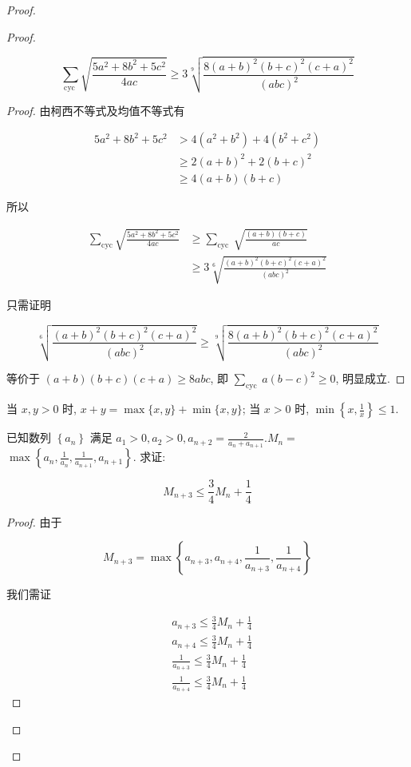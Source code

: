 \begin{proof}
\begin{example}
\begin{solution}
\begin{note}
\begin{solution}
\begin{proof}
\begin{example}
	$$
	\sum_{\text {cyc }} \sqrt{\frac{5 a^{2}+8 b^{2}+5 c^{2}}{4 a c}} \geqslant 3 \sqrt[9]{\frac{8(a+b)^{2}(b+c)^{2}(c+a)^{2}}{(a b c)^{2}}}
	$$
\end{example}
\begin{proof}
	由柯西不等式及均值不等式有
	
	$$
	\begin{aligned}
	5 a^{2}+8 b^{2}+5 c^{2} & >4\left(a^{2}+b^{2}\right)+4\left(b^{2}+c^{2}\right) \\
	& \geqslant 2(a+b)^{2}+2(b+c)^{2} \\
	& \geqslant 4(a+b)(b+c)
	\end{aligned}
	$$
	
	所以
	
	$$
	\begin{aligned}
	\sum_{\mathrm{cyc}} \sqrt{\frac{5 a^{2}+8 b^{2}+5 c^{2}}{4 a c}} & \geqslant \sum_{\text {cyc }} \sqrt{\frac{(a+b)(b+c)}{a c}} \\
	& \geqslant 3 \sqrt[6]{\frac{(a+b)^{2}(b+c)^{2}(c+a)^{2}}{(a b c)^{2}}}
	\end{aligned}
	$$
	
	只需证明
	
	$$
	\sqrt[6]{\frac{(a+b)^{2}(b+c)^{2}(c+a)^{2}}{(a b c)^{2}}} \geqslant \sqrt[9]{\frac{8(a+b)^{2}(b+c)^{2}(c+a)^{2}}{(a b c)^{2}}}
	$$
	
	等价于 $(a+b)(b+c)(c+a) \geqslant 8 a b c$, 即 $\sum_{\text {cyc }} a(b-c)^{2} \geqslant 0$, 明显成立.
\end{proof}
\begin{note}
	当 $x, y>0$ 时, $x+y=\max \{x, y\}+\min \{x, y\}$; 当 $x>0$ 时, $\min \left\{x, \frac{1}{x}\right\} \leqslant 1$.
\end{note}

\begin{example}
	已知数列 $\left\{a_{n}\right\}$ 满足 $a_{1}>0, a_{2}>0, a_{n+2}=\frac{2}{a_{n}+a_{n+1}} . M_{n}=$ $\max \left\{a_{n}, \frac{1}{a_{n}}, \frac{1}{a_{n+1}}, a_{n+1}\right\}$. 求证:
	
	$$
	M_{n+3} \leqslant \frac{3}{4} M_{n}+\frac{1}{4}
	$$
\end{example}
\begin{proof}
	由于
	
	$$
	M_{n+3}=\max \left\{a_{n+3}, a_{n+4}, \frac{1}{a_{n+3}}, \frac{1}{a_{n+4}}\right\}
	$$
	
	我们需证
	
	$$
	\begin{aligned}
	& a_{n+3} \leqslant \frac{3}{4} M_{n}+\frac{1}{4} \\
	& a_{n+4} \leqslant \frac{3}{4} M_{n}+\frac{1}{4} \\
	& \frac{1}{a_{n+3}} \leqslant \frac{3}{4} M_{n}+\frac{1}{4} \\
	& \frac{1}{a_{n+4}} \leqslant \frac{3}{4} M_{n}+\frac{1}{4}
	\end{aligned}
	$$
	

\end{proof}
\end{proof}
\end{solution}
\end{note}
\end{solution}
\end{example}
\end{proof}
